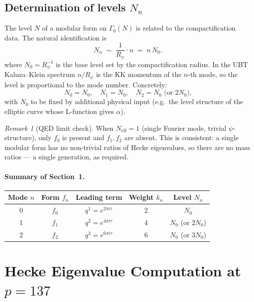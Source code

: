 \documentclass[12pt,a4paper]{article}
\theoremstyle{remark}
\newtheorem{remark}[theorem]{Remark}
\begin{document}
\subsection{Determination of levels $N_n$}

The level $N$ of a modular form on $\Gamma_0(N)$ is related to the
compactification data.  The natural identification is
\begin{equation}
  \label{eq:level}
  N_n \;\sim\; \frac{1}{R_\psi}\cdot n \;=\; n\,N_0,
\end{equation}
where $N_0 = R_\psi^{-1}$ is the base level set by the compactification radius.
In the UBT Kaluza--Klein spectrum $n/R_\psi$ is the KK momentum of the $n$-th mode,
so the level is proportional to the mode number.
Concretely:
\begin{equation}
  \label{eq:levels}
  N_0 = N_0,\quad N_1 = N_0,\quad N_2 = N_0 \text{ (or }2N_0),
\end{equation}
with $N_0$ to be fixed by additional physical input (e.g.\ the level structure
of the elliptic curve whose L-function gives $\alpha$).

\begin{remark}[QED limit check]
When $N_{\mathrm{eff}}=1$ (single Fourier mode, trivial $\psi$-structure),
only $f_0$ is present and $f_1,f_2$ are absent.  This is consistent:
a single modular form has no non-trivial ratios of Hecke eigenvalues,
so there are no mass ratios — a single generation, as required.
\checkmark
\end{remark}

\paragraph{Summary of Section~1.}

\begin{center}
\begin{tabular}{@{}ccccc@{}}
\toprule
Mode $n$ & Form $f_n$ & Leading term & Weight $k_n$ & Level $N_n$\\
\midrule
0 & $f_0$ & $q^1 = e^{2\pi i\tau}$ & 2 & $N_0$\\
1 & $f_1$ & $q^2 = e^{4\pi i\tau}$ & 4 & $N_0$ (or $2N_0$)\\
2 & $f_2$ & $q^3 = e^{6\pi i\tau}$ & 6 & $N_0$ (or $3N_0$)\\
\bottomrule
\end{tabular}
\end{center}

\section{Hecke Eigenvalue Computation at $p=137$}
\label{sec:hecke_computation}
\end{document}
